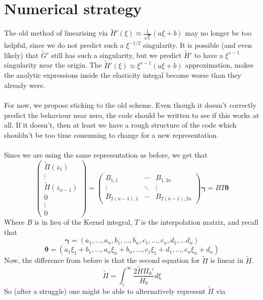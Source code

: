 \documentclass{article}
\newcommand{\bs}{\boldsymbol}                               %
\begin{document}
\section{Numerical strategy}
The old method of linearising via $\tilde{H}'(\xi) \approx 
\frac{1}{\sqrt{\xi}}(a\xi+b)$ may no longer be too helpful, since we do not 
predict such a $\xi^{-1/2}$ singularity. It is possible (and even likely) 
that $\tilde{G}'$ still has such a singularity, but we predict $\tilde{H}'$ 
to have a $\xi^{s-1}$ singularity near the origin. The 
$\tilde{H}'(\xi) \approx \xi^{s-1}(a\xi+b)$ 
approximation, makes the analytic expressions inside the elasticity integal 
become worse than they already were.
\\
\\
For now, we propose sticking to the old scheme. Even though it doesn't correctly
predict the behaviour near zero, the code should be written to see if this works
at all. If it doesn't, then at least we have a rough structure of the code
which shouldn't be too time consuming to change for a new representation.
\\
\\
Since we are using the same representation as before, we get that 
\[ \left( \begin{array}{c} \tilde{\Pi}(z_1) \\ \vdots \\ \tilde{\Pi}(z_{n-1}) 
\\[4pt] 0 \\ \vdots \\ 0 \end{array} \right) =
\left( \begin{array}{ccc} B_{1,1} & \cdots & B_{1 , 2n} \\
\vdots & \ddots & \vdots \\ B_{2(n-1),1} & \cdots & B_{2(n-1) , 2n} 
\end{array}
\right) \bs{\gamma} = BT\bs{\theta} \]
Where $B$ is in lieu of the Kernel integral, $T$ is the interpolation matrix,
and recall that 
\[ \bs{\gamma} = (a_1, \dots, a_n, b_1, \dots , b_n, c_1, \dots, c_n, d_1, \dots 
 d_n) \]
\[ \bs{\theta} = (a_1\xi_1+b_1, \dots, a_n\xi_n+b_n,\dots , c_1\xi_1+d_1, \dots,
 c_n \xi_n +  d_n) \]
Now, the difference from before is that the second equation for $\tilde{\Pi}$ 
is linear in $\tilde{H}$. 
\[ \tilde{\Pi} = \int_z^{\infty} \frac{2 \tilde{H} \Pi_0'}{H_0} d\xi \]
So (after a struggle) one might be able to alternatively represent 
$\tilde{\Pi}$ via 
\end{document}
